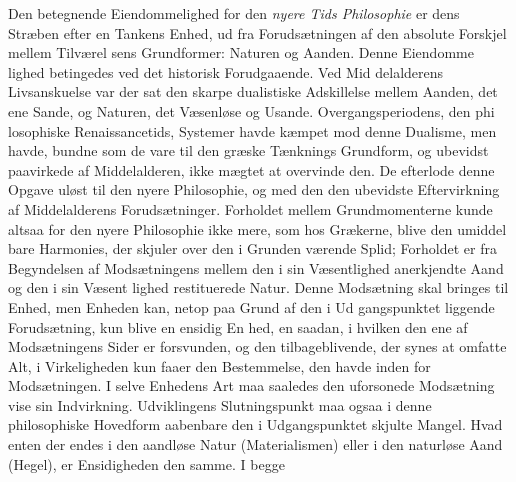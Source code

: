 \documentclass[12pt,a4paper]{book}
\begin{document}
Den betegnende Eiendommelighed for den \emph{nyere Tids
Philosophie} er dens Stræben efter en Tankens Enhed, ud
fra Forudsætningen af den absolute Forskjel mellem Tilværel\-%
sens Grundformer: Naturen og Aanden. Denne Eiendomme\-%
lighed betingedes ved det historisk Forudgaaende. Ved Mid\-%
delalderens Livsanskuelse var der sat den skarpe dualistiske
Adskillelse mellem Aanden, det ene Sande, og Naturen,
det Væsenløse og Usande. Overgangsperiodens, den phi\-%
losophiske Renaissancetids, Systemer havde kæmpet mod
denne Dualisme, men havde, bundne som de vare til den
græske Tænknings Grundform, og ubevidst paavirkede af
Middelalderen, ikke mægtet at overvinde den. De efterlode
denne Opgave uløst til den nyere Philosophie, og med den
den ubevidste Eftervirkning af Middelalderens Forudsætninger.
Forholdet mellem Grundmomenterne kunde altsaa for den nyere
Philosophie ikke mere, som hos Grækerne, blive den umiddel\-%
bare Harmonies, der skjuler over den i Grunden værende
Splid; Forholdet er fra Begyndelsen af Modsætningens mellem
den i sin Væsentlighed anerkjendte Aand og den i sin Væsent\-%
lighed restituerede Natur. Denne Modsætning skal bringes til
Enhed, men Enheden kan, netop paa Grund af den i Ud\-%
gangspunktet liggende Forudsætning, kun blive en ensidig En\-%
hed, en saadan, i hvilken den ene af Modsætningens Sider er
forsvunden, og den tilbageblivende, der synes at omfatte Alt,
i Virkeligheden kun faaer den Bestemmelse, den havde inden\-%
for Modsætningen. I selve Enhedens Art maa saaledes den
uforsonede Modsætning vise sin Indvirkning. Udviklingens
Slutningspunkt maa ogsaa i denne philosophiske Hovedform
aabenbare den i Udgangspunktet skjulte Mangel. Hvad enten
der endes i den aandløse Natur (Materialismen) eller i den
naturløse Aand (Hegel), er Ensidigheden den samme. I begge
\end{document}
